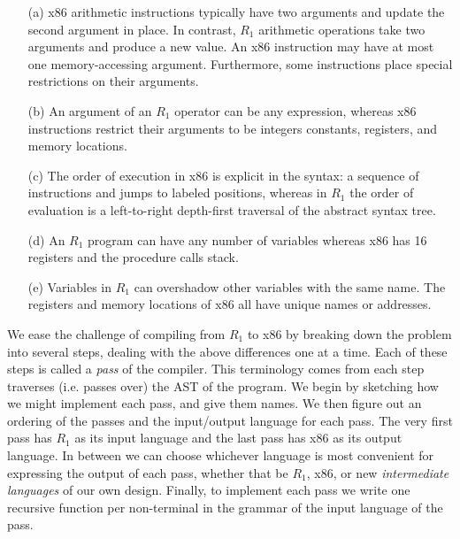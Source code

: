 \documentclass[11pt]{book}
\begin{document}
\begin{enumerate}
\item[(a)] x86 arithmetic instructions typically have two arguments
  and update the second argument in place. In contrast, $R_1$
  arithmetic operations take two arguments and produce a new value.
  An x86 instruction may have at most one memory-accessing argument.
  Furthermore, some instructions place special restrictions on their
  arguments.

\item[(b)] An argument of an $R_1$ operator can be any expression,
  whereas x86 instructions restrict their arguments to be integers
  constants, registers, and memory locations.

\item[(c)] The order of execution in x86 is explicit in the syntax: a
  sequence of instructions and jumps to labeled positions, whereas in
  $R_1$ the order of evaluation is a left-to-right depth-first
  traversal of the abstract syntax tree.

\item[(d)] An $R_1$ program can have any number of variables whereas
  x86 has 16 registers and the procedure calls stack.

\item[(e)] Variables in $R_1$ can overshadow other variables with the
  same name. The registers and memory locations of x86 all have unique
  names or addresses.
\end{enumerate}

We ease the challenge of compiling from $R_1$ to x86 by breaking down
the problem into several steps, dealing with the above differences one
at a time.  Each of these steps is called a \emph{pass} of the
compiler.
%
This terminology comes from each step traverses (i.e. passes over) the
AST of the program.
%
We begin by sketching how we might implement each pass, and give them
names.  We then figure out an ordering of the passes and the
input/output language for each pass. The very first pass has $R_1$ as
its input language and the last pass has x86 as its output
language. In between we can choose whichever language is most
convenient for expressing the output of each pass, whether that be
$R_1$, x86, or new \emph{intermediate languages} of our own design.
Finally, to implement each pass we write one recursive function per
non-terminal in the grammar of the input language of the pass.
\end{document}
